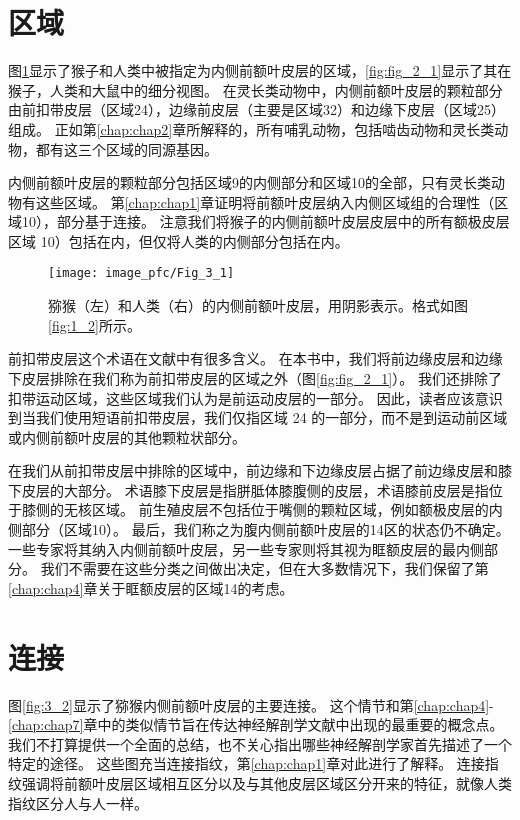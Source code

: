 \section{区域}

图\ref{fig:3_1}显示了猴子和人类中被指定为内侧前额叶皮层的区域，\ref{fig:fig_2_1}显示了其在猴子，人类和大鼠中的细分视图。
在灵长类动物中，内侧前额叶皮层的颗粒部分由前扣带皮层（区域24），边缘前皮层（主要是区域32）和边缘下皮层（区域25）组成。
正如第\ref{chap:chap2}章所解释的，所有哺乳动物，包括啮齿动物和灵长类动物，都有这三个区域的同源基因。\par
内侧前额叶皮层的颗粒部分包括区域9的内侧部分和区域10的全部，只有灵长类动物有这些区域。
第\ref{chap:chap1}章证明将前额叶皮层纳入内侧区域组的合理性（区域10），部分基于连接。
注意我们将猴子的内侧前额叶皮层皮层中的所有额极皮层区域 10）包括在内，但仅将人类的内侧部分包括在内。

\begin{figure}[!htb]
	\centering
	\texttt{[image: image\_pfc/Fig\_3\_1]}
	\caption{猕猴（左）和人类（右）的内侧前额叶皮层，用阴影表示。格式如图\ref{fig:1_2}所示。}
	\label{fig:3_1}
\end{figure}


前扣带皮层这个术语在文献中有很多含义。
在本书中，我们将前边缘皮层和边缘下皮层排除在我们称为前扣带皮层的区域之外（图\ref{fig:fig_2_1}）。
我们还排除了扣带运动区域，这些区域我们认为是前运动皮层的一部分。
因此，读者应该意识到当我们使用短语前扣带皮层，我们仅指区域 24 的一部分，而不是到运动前区域或内侧前额叶皮层的其他颗粒状部分。\par


在我们从前扣带皮层中排除的区域中，前边缘和下边缘皮层占据了前边缘皮层和膝下皮层的大部分。
术语膝下皮层是指胼胝体膝腹侧的皮层，术语膝前皮层是指位于膝侧的无核区域。
前生殖皮层不包括位于嘴侧的颗粒区域，例如额极皮层的内侧部分（区域10）。
最后，我们称之为腹内侧前额叶皮层的14区的状态仍不确定。
一些专家将其纳入内侧前额叶皮层，另一些专家则将其视为眶额皮层的最内侧部分。
我们不需要在这些分类之间做出决定，但在大多数情况下，我们保留了第\ref{chap:chap4}章关于眶额皮层的区域14的考虑。\par



\section{连接}

图\ref{fig:3_2}显示了猕猴内侧前额叶皮层的主要连接。
这个情节和第\ref{chap:chap4}-\ref{chap:chap7}章中的类似情节旨在传达神经解剖学文献中出现的最重要的概念点。
我们不打算提供一个全面的总结，也不关心指出哪些神经解剖学家首先描述了一个特定的途径。
这些图充当连接指纹，第\ref{chap:chap1}章对此进行了解释。
连接指纹强调将前额叶皮层区域相互区分以及与其他皮层区域区分开来的特征，就像人类指纹区分人与人一样。\par


